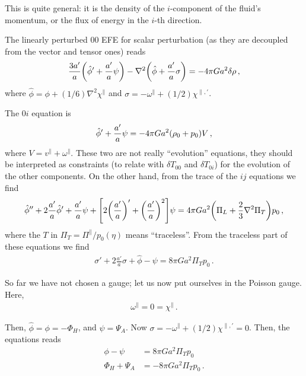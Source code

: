 \documentclass[main.tex]{subfiles}
\begin{document}
This is quite general: it is the density of the \(i\)-component of the fluid's momentum, or the flux of energy in the \(i\)-th direction.

The linearly perturbed \(00\) EFE for scalar perturbation (as they are decoupled from the vector and tensor ones) reads 
%
\begin{align}
\frac{3 a'}{a} \qty(\hat{\phi}' + \frac{a'}{a} \psi ) - \nabla^2 \qty(\hat{\phi} + \frac{a'}{a} \sigma ) = - 4 \pi G a^2 \delta \rho 
\,,
\end{align}
%
where \(\hat{\phi} = \phi + (1/6) \nabla^2 \chi^{\parallel}\) and \(\sigma = - \omega^{\parallel} + (1/2) \chi^{\parallel, \prime}\). 

The \(0i\) equation is 
%
\begin{align}
\hat{\phi}' + \frac{a'}{a} \psi = - 4 \pi G a^2 \qty(\rho_0 + p_0 )V
\,,
\end{align}
%
where \(V = v^{\parallel} + \omega^{\parallel}\). 
These two are not really ``evolution'' equations, they should be interpreted as constraints (to relate with \(\delta T_{00} \) and \(\delta T_{0i}\)) for the evolution of the other components. 
On the other hand, from the trace of the \(ij\) equations we find 
%
\begin{align}
\hat{\phi}'' + 2 \frac{a'}{a} \hat{\phi}' + \frac{a'}{a} \psi +
\qty[2 \qty(\frac{a'}{a})' + \qty(\frac{a'}{a})^2] \psi 
= 4 \pi G a^2 \qty(\Pi _L + \frac{2}{3} \nabla^2 \Pi _T)p_0 
\,,
\end{align}
%
where the \(T\) in \(\Pi _T = \Pi^{\parallel} / p_0 (\eta )\) means ``traceless''. 
From the traceless part of these equations we find 
%
\begin{align}
\sigma ' + 2 \frac{a'}{a} \sigma + \hat{\phi} - \psi = 8 \pi G a^2 \Pi _T p_0 
\,.
\end{align}

So far we have not chosen a gauge; let us now put ourselves in the Poisson gauge. Here, 
%
\begin{align}
\omega^{\parallel} = 0 = \chi^{\parallel}
\,.
\end{align}

Then, \(\hat{\phi} = \phi = - \Phi _H\), and \(\psi = \Psi _A\). 
Now \(\sigma = - \omega^{\parallel} + (1/2) \chi^{\parallel, \prime} = 0\). 
Then, the equations reads 
%
\begin{align}
\phi - \psi &= 8 \pi G a^2 \Pi_T p_0  \\
\Phi _H + \Psi _A  &= - 8 \pi G a^2 \Pi _T  p_0 
\,.
\end{align}
\end{document}
